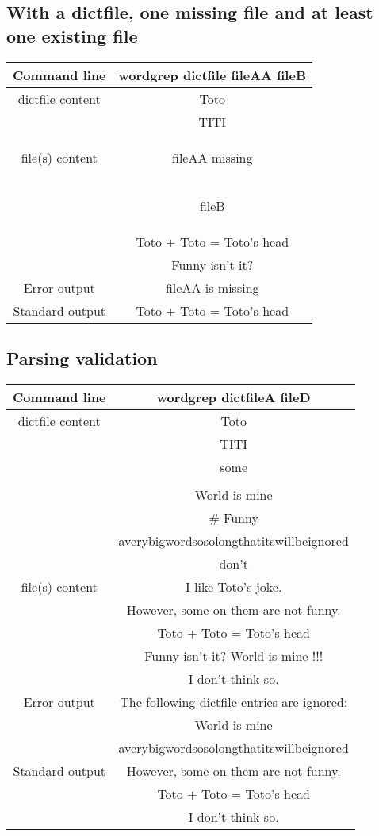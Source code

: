 \documentclass[11pt]{article} %
\begin{document}
\subsection{With a dictfile, one missing file and at least one existing file}
\begin{tabular}{|c|c|}
\hline
Command line &
wordgrep dictfile fileAA fileB\\
\hline
dictfile content &
Toto\\
&TITI\\
\hline
file(s) content & \begin{bf}fileAA missing\end{bf}\\
&\begin{bf}fileB\end{bf}\\
&Toto + Toto = Toto's head\\
&Funny isn't it?\\
\hline
Error output &
fileAA is missing\\
\hline
Standard output &Toto + Toto = Toto's head\\
\hline
\end{tabular}
\subsection{Parsing validation}
\begin{tabular}{|c|c|}
\hline
Command line &
wordgrep dictfileA fileD\\
\hline
dictfile content &
Toto\\
&TITI\\
&   some\\
&\\
&World is mine\\
&\# Funny\\
&averybigwordsosolongthatitswillbeignored\\
&don't\\
\hline
file(s) content & I like Toto's joke.\\
&However, some on them are not funny.\\
&Toto + Toto = Toto's head\\
&Funny isn't it? World is mine !!!\\
&I don't think so.\\
\hline
Error output &
The following dictfile entries are ignored:\\
&World is mine\\
&averybigwordsosolongthatitswillbeignored\\
\hline
Standard output &
However, some on them are not funny.\\
&Toto + Toto = Toto's head\\
&I don't think so.\\
\hline
\end{tabular}
\end{document}
